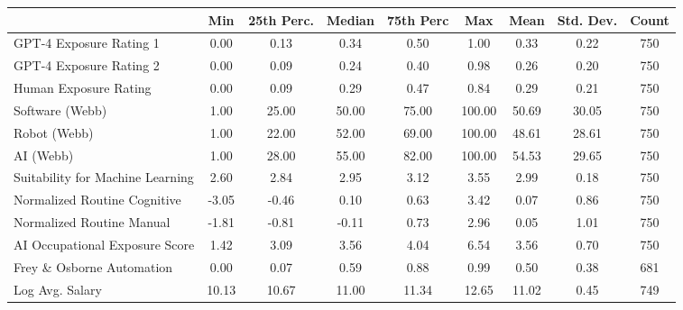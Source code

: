 {
\def\sym#1{\ifmmode^{#1}\else\(^{#1}\)\fi}
\begin{tabular}{l*{1}{cccccccc}}
\hline\hline
                    &         Min&  25th Perc.&      Median&   75th Perc&         Max&        Mean&   Std. Dev.&       Count\\
\hline
GPT-4 Exposure Rating 1&        0.00&        0.13&        0.34&        0.50&        1.00&        0.33&        0.22&         750\\
GPT-4 Exposure Rating 2&        0.00&        0.09&        0.24&        0.40&        0.98&        0.26&        0.20&         750\\
Human Exposure Rating&        0.00&        0.09&        0.29&        0.47&        0.84&        0.29&        0.21&         750\\
Software (Webb)     &        1.00&       25.00&       50.00&       75.00&      100.00&       50.69&       30.05&         750\\
Robot (Webb)        &        1.00&       22.00&       52.00&       69.00&      100.00&       48.61&       28.61&         750\\
AI (Webb)           &        1.00&       28.00&       55.00&       82.00&      100.00&       54.53&       29.65&         750\\
Suitability for Machine Learning&        2.60&        2.84&        2.95&        3.12&        3.55&        2.99&        0.18&         750\\
Normalized Routine Cognitive&       -3.05&       -0.46&        0.10&        0.63&        3.42&        0.07&        0.86&         750\\
Normalized Routine Manual&       -1.81&       -0.81&       -0.11&        0.73&        2.96&        0.05&        1.01&         750\\
AI Occupational Exposure Score     &        1.42&        3.09&        3.56&        4.04&        6.54&        3.56&        0.70&         750\\
Frey \& Osborne Automation&        0.00&        0.07&        0.59&        0.88&        0.99&        0.50&        0.38&         681\\
Log Avg. Salary     &       10.13&       10.67&       11.00&       11.34&       12.65&       11.02&        0.45&         749\\
\hline\hline
\end{tabular}
}
